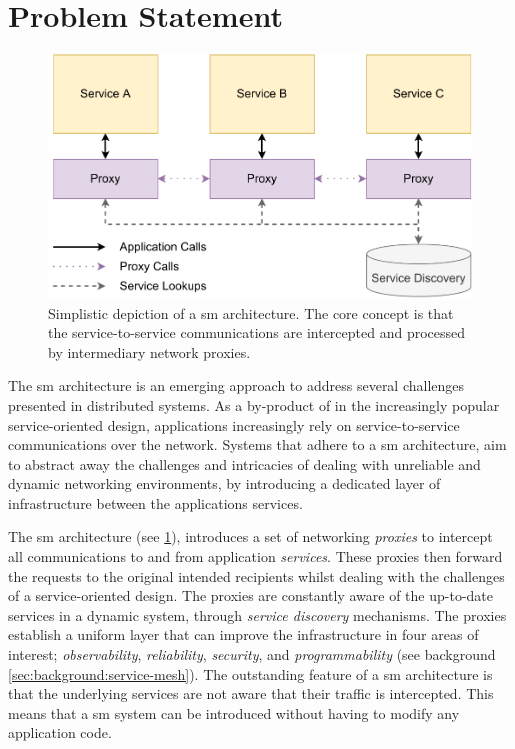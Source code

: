 \section{Problem Statement}
\label{sec:introduction:problem-statement}


\begin{figure}[!t]
    \centering
    
    \includegraphics[width=.8\linewidth]{1_introduction/figures/service-mesh-architecture-simple.pdf}

    \caption[Simplistic depiction of a \gls{sm} architecture.]{Simplistic depiction of a \gls{sm} architecture. The core concept is that the service-to-service communications are intercepted and processed by intermediary network proxies.}
    \label{fig:service-mesh-architecture-simplified}
\end{figure}

The \gls{sm} architecture is an emerging approach to address several challenges presented in distributed systems. As a by-product of in the increasingly popular service-oriented design, applications increasingly rely on service-to-service communications over the network. Systems that adhere to a \gls{sm} architecture, aim to abstract away the challenges and intricacies of dealing with unreliable and dynamic networking environments, by introducing a dedicated layer of infrastructure between the applications services. 

The \gls{sm} architecture (see \cref{fig:service-mesh-architecture-simplified}), introduces a set of networking \textit{proxies} to intercept all communications to and from application \textit{services}. These proxies then forward the requests to the original intended recipients whilst dealing with the challenges of a service-oriented design. The proxies are constantly aware of the up-to-date services in a dynamic system, through \textit{service discovery} mechanisms. The proxies establish a uniform layer that can improve the infrastructure in four areas of interest; \textit{observability}, \textit{reliability}, \textit{security}, and \textit{programmability} (see background \cref{sec:background:service-mesh}). The outstanding feature of a \gls{sm} architecture is that the underlying services are not aware that their traffic is intercepted. This means that a \gls{sm} system can be introduced without having to modify any application code.

